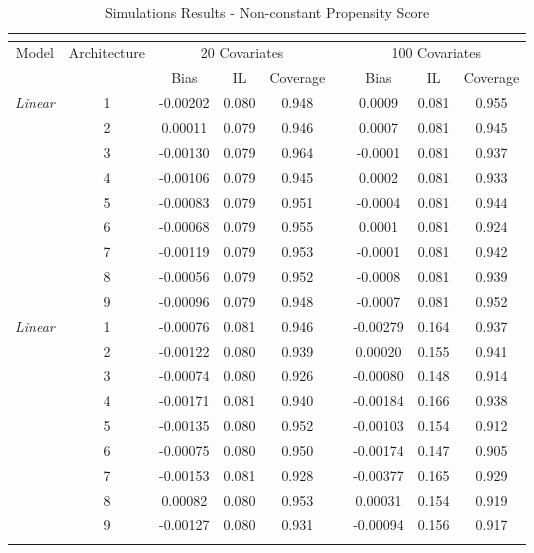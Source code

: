 \documentclass[11pt]{article}
\numberwithin{equation}{section}
\theoremstyle{definition}
\begin{document}
\begin{table}[h]
	\begin{centering}
	\caption{Simulations Results - Non-constant Propensity Score \label{tab:simuls2}}
	~
	\par\end{centering}
	\begin{onehalfspace}
		\centering{}%
		\begin{tabular}{ccccccccc}
			\multicolumn{9}{c}{}\tabularnewline
			\hline 
			\hline 
			\multirow{2}{*}{Model} & \multirow{2}{*}{Architecture} & \multicolumn{3}{c}{20 Covariates} &  & \multicolumn{3}{c}{100 Covariates}\tabularnewline
			\cline{3-5} \cline{7-9} 
			 &  & Bias & IL & Coverage &  & Bias & IL & Coverage\tabularnewline
			\hline 
			\multirow{9}{*}{\textit{Linear}}  & 1 & -0.00202 & 0.080 & 0.948 &  & 0.0009 & 0.081 & 0.955\tabularnewline
			 & 2 & 0.00011 & 0.079 & 0.946 &  & 0.0007 & 0.081 & 0.945\tabularnewline
			 & 3 & -0.00130 & 0.079 & 0.964 &  & -0.0001 & 0.081 & 0.937\tabularnewline
			 & 4 & -0.00106 & 0.079 & 0.945 &  & 0.0002 & 0.081 & 0.933\tabularnewline
			 & 5 & -0.00083 & 0.079 & 0.951 &  & -0.0004 & 0.081 & 0.944\tabularnewline
			 & 6 & -0.00068 & 0.079 & 0.955 &  & 0.0001 & 0.081 & 0.924\tabularnewline
			 & 7 & -0.00119 & 0.079 & 0.953 &  & -0.0001 & 0.081 & 0.942\tabularnewline
			 & 8 & -0.00056 & 0.079 & 0.952 &  & -0.0008 & 0.081 & 0.939\tabularnewline
			 & 9 & -0.00096 & 0.079 & 0.948 &  & -0.0007 & 0.081 & 0.952\tabularnewline
			\hline 
			\multirow{9}{*}{\textit{Linear}}  & 1 & -0.00076 & 0.081 & 0.946 &  & -0.00279 & 0.164 & 0.937\tabularnewline
			 & 2 & -0.00122 & 0.080 & 0.939 &  & 0.00020 & 0.155 & 0.941\tabularnewline
			 & 3 & -0.00074 & 0.080 & 0.926 &  & -0.00080 & 0.148 & 0.914\tabularnewline
			 & 4 & -0.00171 & 0.081 & 0.940 &  & -0.00184 & 0.166 & 0.938\tabularnewline
			 & 5 & -0.00135 & 0.080 & 0.952 &  & -0.00103 & 0.154 & 0.912\tabularnewline
			 & 6 & -0.00075 & 0.080 & 0.950 &  & -0.00174 & 0.147 & 0.905\tabularnewline
			 & 7 & -0.00153 & 0.081 & 0.928 &  & -0.00377 & 0.165 & 0.929\tabularnewline
			 & 8 & 0.00082 & 0.080 & 0.953 &  & 0.00031 & 0.154 & 0.919\tabularnewline
			 & 9 & -0.00127 & 0.080 & 0.931 &  & -0.00094 & 0.156 & 0.917\tabularnewline
			\hline 
			\hline 
			\multicolumn{9}{c}{}\tabularnewline
		\end{tabular}
	\end{onehalfspace}
\end{table}
\end{document}
